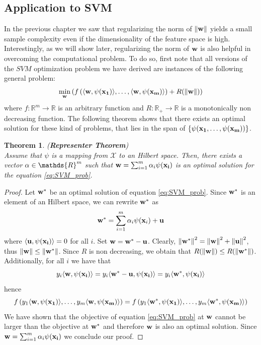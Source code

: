 \documentclass[12pt]{report}
\theoremstyle{plain}
\newtheorem{theorem}{Theorem}[chapter]
\newcommand\mcl[1]{\mathcal{#1}}
\newcommand\sprod[2]{\langle \vb{#1},\vb{#2}\rangle}
\begin{document}
\begin{flushleft}
\subsection{Application to SVM}
In the previous chapter we saw that regularizing the norm of $\norm{\vb{w}}$ yields a small
sample complexity even if the dimensionality of the feature space is high. Interestingly, as we will show later, regularizing the norm of $\vb{w}$ is also helpful in overcoming the computational problem. To do so, first note that all versions of the $SVM$ optimization problem we have derived are instances of the following general problem:
\begin{equation} \min_{\vb{w}}\left(f\left(\sprod{w}{\psi(x_1)},\dots,\sprod{w}{\psi(x_m)}\right)+R(\norm{\vb{w}})\right)
\label{eq:SVM_prob}
\end{equation}
where $f:\mathds{R}^m\to\mathds{R}$ is an arbitrary function and $R:\mathds{R}_+\to\mathds{R}$ is a monotonically non decreasing function. The following theorem shows that there exists an optimal solution for these kind of problems, that lies in the span of $\left\{\psi(\vb{x_1},\dots,\psi(\vb{x_m}))\right\}$.
\begin{theorem} (\textbf{Representer Theorem})\\
	Assume that $\psi$ is a mapping from $\mcl{X}$ to an Hilbert space. Then, there exists a vector $\vb{\alpha}\in\mathds{R}^m$ such that $\vb{w}=\sum_{i=1}^m\alpha_i\psi(\vb{x_i})$ is an optimal solution for the equation \ref{eq:SVM_prob}.
\end{theorem}
\begin{proof}
	Let $\vb{w}^*$ be an optimal solution of equation \ref{eq:SVM_prob}. Since $\vb{w}^*$ is an element of an Hilbert space, we can rewrite $\vb{w}^*$ as
	\[ \vb{w}^*=\sum_{i=1}^m\alpha_i\psi(\vb{x}_i)+\vb{u} \]
	where $\sprod{u}{\psi(x_i)}=0$ for all $i$. Set $\vb{w}=\vb{w}^*-\vb{u}$. Clearly, $\norm{\vb{w}^*}^2=\norm{\vb{w}}^2+\norm{\vb{u}}^2$, thus $\norm{\vb{w}}\leq\norm{\vb{w}^*}$. Since $R$ is non decreasing, we obtain that $R(\norm{\vb{w}})\leq R(\norm{\vb{w}^*})$. Additionally, for all $i$ we have that 
	\[ y_i\sprod{w}{\psi(x_i)}=y_i\sprod{w^*-u}{\psi(x_i)}=y_i\sprod{w^*}{\psi(x_i)} \]
	hence
	\[ f\left(y_1\sprod{w}{\psi(x_1)},\dots,y_m\sprod{w}{\psi(x_m)}\right) = f\left(y_1\sprod{w^*}{\psi(x_1)},\dots,y_m\sprod{w^*}{\psi(x_m)}\right) \]
	We have shown that the objective of equation \ref{eq:SVM_prob} at $\vb{w}$ cannot be larger than the objective at $\vb{w^*}$ and therefore $\vb{w}$ is also an optimal solution. Since $\vb{w}=\sum_{i=1}^m\alpha_i\psi(\vb{x_i})$ we conclude our proof.

\end{proof}
\end{flushleft}
\end{document}
